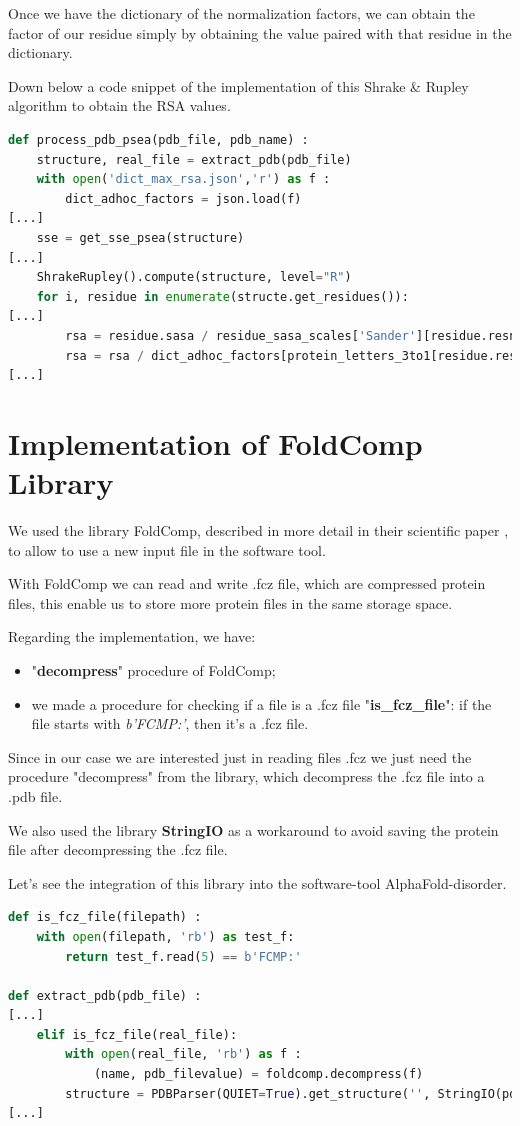 Once we have the dictionary of the normalization factors, we can obtain the factor of our residue simply by obtaining the value paired with that residue in the dictionary.

Down below a code snippet of the implementation of this Shrake \& Rupley algorithm to obtain the RSA values.

\begin{lstlisting}[language=Python, caption=Integration of rsa with SASA on process\_pdb\_psea procedure]
def process_pdb_psea(pdb_file, pdb_name) :
    structure, real_file = extract_pdb(pdb_file)
    with open('dict_max_rsa.json','r') as f :
        dict_adhoc_factors = json.load(f)
[...]
    sse = get_sse_psea(structure)
[...]
    ShrakeRupley().compute(structure, level="R")
    for i, residue in enumerate(structe.get_residues()):
[...]
        rsa = residue.sasa / residue_sasa_scales['Sander'][residue.resname]
        rsa = rsa / dict_adhoc_factors[protein_letters_3to1[residue.resname]]
[...]
\end{lstlisting}

\pagebreak

\section{Implementation of FoldComp Library}
We used the library FoldComp, described in more detail in their scientific paper \cite{foldcomp}, to allow to use a new input file in the software tool.

With FoldComp we can read and write .fcz file, which are compressed protein files, this enable us to store more protein files in the same storage space.

Regarding the implementation, we have:
\begin{itemize}
    \item "\textbf{decompress}" procedure of FoldComp;
    \item we made a procedure for checking if a file is a .fcz file "\textbf{is\_fcz\_file}": if the file starts with \textit{b'FCMP:'}, then it's a .fcz file.
\end{itemize}
Since in our case we are interested just in reading files .fcz we just need the procedure "decompress" from the library, which decompress the .fcz file into a .pdb file.

We also used the library \textbf{StringIO} as a workaround to avoid saving the protein file after decompressing the .fcz file.

Let's see the integration of this library into the software-tool AlphaFold-disorder.

\begin{lstlisting}[language=Python, caption=Integration of FoldComp]
def is_fcz_file(filepath) :
    with open(filepath, 'rb') as test_f:
        return test_f.read(5) == b'FCMP:'

def extract_pdb(pdb_file) :
[...]
    elif is_fcz_file(real_file):
        with open(real_file, 'rb') as f :
            (name, pdb_filevalue) = foldcomp.decompress(f)
        structure = PDBParser(QUIET=True).get_structure('', StringIO(pdb_filevalue))
[...]
\end{lstlisting}
